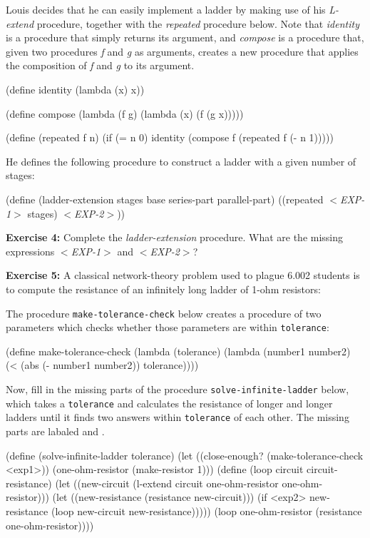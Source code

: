 \vspace{3in}

Louis decides that he can easily implement a ladder by making use of
his {\it L-extend} procedure, together with the {\it repeated} procedure
below.  Note that {\it identity} is a procedure that simply returns its
argument, and {\it compose} is a procedure that, given two procedures
{\it f} and {\it g} as arguments, creates a new procedure that applies
the composition of {\it f} and {\it g} to its argument.

\beginlisp
(define identity (lambda (x) x))

(define compose (lambda (f g)
                  (lambda (x) (f (g x)))))

(define (repeated f n)
  (if (= n 0)
      identity
      (compose f (repeated f (- n 1)))))
\endlisp

He defines the following procedure to construct a ladder with a
given number of stages:

\beginlisp
(define (ladder-extension stages base series-part parallel-part)
  ((repeated {\it $<$EXP-1$>$} stages) {\it $<$EXP-2$>$}))
\endlisp

{\bf Exercise 4:}
Complete the {\it ladder-extension} procedure.  What are the missing
expressions
{\it $<$EXP-1$>$} and {\it $<$EXP-2$>$}?

{\bf Exercise 5:}
A classical network-theory problem used to plague 6.002 students is to
compute the resistance of an infinitely long ladder of 1-ohm
resistors:  

\vspace{3in}

The procedure {\tt make-tolerance-check} below creates a procedure of two
parameters which checks whether those parameters are within {\tt tolerance}:

\beginlisp
(define make-tolerance-check
  (lambda (tolerance)
    (lambda (number1 number2)
      (< (abs (- number1 number2)) tolerance))))
\endlisp

Now, fill in the missing parts of the procedure {\tt solve-infinite-ladder}
below, which takes a {\tt tolerance} and calculates the resistance of longer
and longer ladders until it finds two answers within {\tt tolerance} of each
other.  The missing parts are labaled {\tt <exp1>} and {\tt <exp2>}.

\beginlisp
(define (solve-infinite-ladder tolerance)
  (let ((close-enough? (make-tolerance-check <exp1>))
        (one-ohm-resistor (make-resistor 1)))
    (define (loop circuit circuit-resistance)
      (let ((new-circuit (l-extend circuit
                                   one-ohm-resistor
                                   one-ohm-resistor)))
        (let ((new-resistance (resistance new-circuit)))
          (if <exp2>
              new-resistance
              (loop new-circuit new-resistance)))))
    (loop one-ohm-resistor (resistance one-ohm-resistor))))
\endlisp

